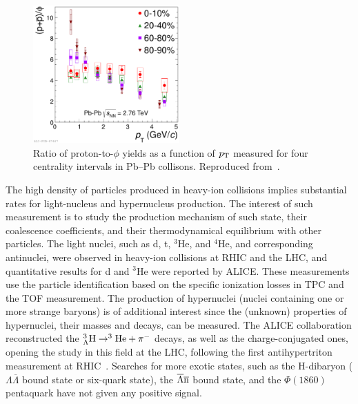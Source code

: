 \begin{figure}
\centering
\includegraphics[width=0.5\textwidth]{ksfigures/ProtonToPhi.pdf}
\caption{Ratio of proton-to-$\phi$ yields as a function of $p_{\rm T}$ measured for four centrality intervals in Pb--Pb collisons. Reproduced from~\cite{Abelev:2014uua}.}
\label{figks:PhiTop}
\end{figure}

The high density of particles produced in heavy-ion collisions implies substantial rates for light-nucleus and hypernucleus production. The interest of such measurement is to study the production mechanism of such state, their coalescence coefficients, and their thermodynamical equilibrium with other particles. The light nuclei, such as d, t, $^3$He, and $^4$He, and corresponding antinuclei, were observed in heavy-ion collisions at RHIC and the LHC, and quantitative results for d and $^3$He were reported by ALICE. These measurements use the particle identification based on the specific ionization losses in TPC and the TOF measurement. The production of hypernuclei (nuclei containing one or more strange baryons) is of additional interest since the (unknown) properties of hypernuclei, their masses and decays, can be measured. The ALICE collaboration reconstructed the $^3_{\Lambda}{\rm H} \rightarrow ^3{\rm He} + \pi^-$ decays, as well as the charge-conjugated ones, opening the study in this field at the LHC, following the first antihypertriton measurement at RHIC~\cite{Abelev:2010rv}. Searches for more exotic states, such as the H-dibaryon ($\Lambda\overline{\Lambda}$ bound state or six-quark state), the $\overline{\Lambda}\overline{\rm n}$ bound state, and the $\Phi(1860)$ pentaquark have not given any positive signal.
